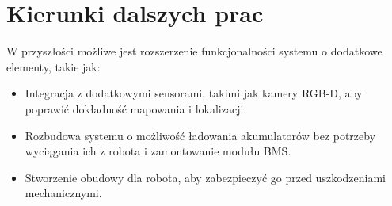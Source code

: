\documentclass[a4paper,twoside,12pt]{book}
\begin{document}
\section{Kierunki dalszych prac}
W przyszłości możliwe jest rozszerzenie funkcjonalności systemu o dodatkowe elementy, takie jak:
\begin{itemize}
	\item Integracja z dodatkowymi sensorami, takimi jak kamery RGB-D, aby poprawić dokładność mapowania i lokalizacji.
	\item Rozbudowa systemu o możliwość ładowania akumulatorów bez potrzeby wyciągania ich z robota i zamontowanie modułu BMS.
	\item Stworzenie obudowy dla robota, aby zabezpieczyć go przed uszkodzeniami mechanicznymi.
\end{itemize}



\backmatter
\end{document}
